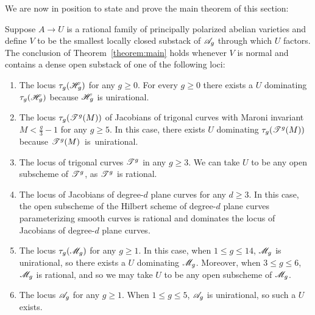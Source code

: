 We are now in position to state and prove the main theorem of this section:
\vspace*{-0.2cm}
\begin{theorem} \label{corollary:examples}
Suppose $A \rightarrow U$ is a rational family of principally polarized abelian varieties
and define $V$ to be the smallest locally closed substack of ${\mathscr A_g}$ through which $U$ factors.
The conclusion of Theorem~\ref{theorem:main} holds whenever $V$ is normal and contains a dense open substack of one of the following loci:
\begin{enumerate}
	       \item[\customlabel{big-hyperelliptic}{(a)}] The locus $\tau_g(\mathscr H_{g})$ for any $g \geq 0$.
		      For every $g \geq 0$ there exists a $U$ dominating $\tau_g(\mathscr H_{g})$ because $\mathscr H_{g}$ is unirational.
               \item[\customlabel{big-maroni}{(b)}] The locus $\tau_g(\mathscr T^{g}(M))$ of Jacobians of trigonal curves with Maroni invariant $M < \frac{g}{3}-1$ for any $g \geq 5$. In this case, there exists $U$ dominating $\tau_g(\mathscr T^{g}(M))$ because \mbox{$\mathscr T^{g}(M)$ is unirational.}
		\item[\customlabel{big-trigonal}{(c)}] The locus of trigonal curves $\mathscr T^{g}$ in any $g \geq 3$.
We can take $U$ to be any open subscheme of $\mathscr T^{g}$, as $\mathscr T^{g}$ is rational.
               \item[\customlabel{big-plane}{(d)}] The locus of Jacobians of degree-$d$ plane curves for any $d \geq 3$. In this case, the open subscheme of the Hilbert scheme
of degree-$d$ plane curves parameterizing smooth curves is rational and dominates the locus of Jacobians of degree-$d$ plane curves.
\item[\customlabel{big-mg}{(e)}] The locus $\tau_g({\mathscr M_g})$ for any $g \geq 1$. In this case, when $1 \leq g \leq 14$, ${\mathscr M_g}$ is unirational, so there exists a $U$ dominating ${\mathscr M_g}$. Moreover, when $3 \leq g \leq 6$, ${\mathscr M_g}$ is rational, and so we may take $U$ to be any open subscheme of ${\mathscr M_g}$.
               \item[\customlabel{big-ag}{(f)}] The locus ${\mathscr A_g}$ for any $g \geq 1$. When $1 \leq g \leq 5$, ${\mathscr A_g}$ is unirational, so such a $U$ exists.
\end{enumerate}
\end{theorem}

